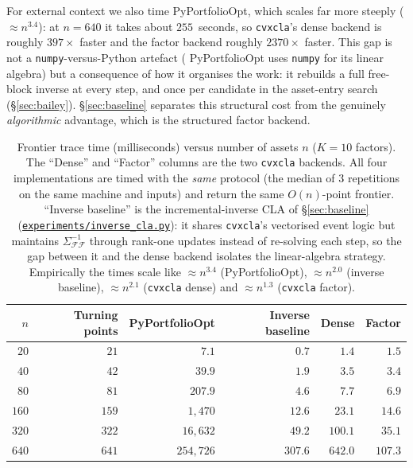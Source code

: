 \documentclass[11pt]{article}
\newcommand{\Sig}{\Sigma}
\newcommand{\F}{\mathcal{F}}        %
\newcommand{\inv}{^{-1}}
\newcommand{\repourl}{https://github.com/cvxgrp/cvxcla}
\newcommand{\srcref}{v1.8.1}
\newcommand{\srcfile}[2]{\href{\repourl/blob/\srcref/#1}{\texttt{#2}}}
\begin{document}
For external context we also time PyPortfolioOpt, which scales far more steeply
($\approx n^{3.4}$): at $n=640$ it takes about $255$~seconds, so \texttt{cvxcla}'s
dense backend is roughly $397\times$ faster and the factor backend roughly
$2370\times$ faster. This gap is not a \texttt{numpy}-versus-Python artefact (
PyPortfolioOpt uses \texttt{numpy} for its linear algebra) but a consequence of
how it organises the work: it rebuilds a full free-block inverse at every step,
and once per candidate in the asset-entry search (\S\ref{sec:bailey}).
\S\ref{sec:baseline} separates this structural cost from the genuinely
\emph{algorithmic} advantage, which is the structured factor backend.

\begin{table}[h]
\centering
\begin{tabular}{rrrrrr}
\toprule
$n$ & Turning points & PyPortfolioOpt & Inverse baseline & Dense & Factor \\
\midrule
$20$  & $21$  & $7.1$        & $0.7$   & $1.4$   & $1.5$ \\
$40$  & $42$  & $39.9$       & $1.9$   & $3.5$   & $3.4$ \\
$80$  & $81$  & $207.9$      & $4.6$   & $7.7$   & $6.9$ \\
$160$ & $159$ & $1{,}470$    & $12.6$  & $23.1$  & $14.6$ \\
$320$ & $322$ & $16{,}632$   & $49.2$  & $100.1$ & $35.1$ \\
$640$ & $641$ & $254{,}726$  & $307.6$ & $642.0$ & $107.3$ \\
\bottomrule
\end{tabular}
\caption{Frontier trace time (milliseconds) versus number of assets $n$ ($K=10$
factors). The ``Dense'' and ``Factor'' columns are the two \texttt{cvxcla}
backends. All four implementations are timed with the \emph{same} protocol (the
median of $3$ repetitions on the same machine and inputs) and return the same
$O(n)$-point frontier. ``Inverse baseline'' is the incremental-inverse CLA of
\S\ref{sec:baseline} (\srcfile{experiments/inverse_cla.py}{experiments/inverse\_cla.py}): it shares
\texttt{cvxcla}'s vectorised event logic but maintains $\Sig_{\F\F}\inv$ through
rank-one updates instead of re-solving each step, so the gap between it and the
dense backend isolates the linear-algebra strategy. Empirically the times scale
like $\approx n^{3.4}$ (PyPortfolioOpt), $\approx n^{2.0}$ (inverse baseline),
$\approx n^{2.1}$ (\texttt{cvxcla} dense) and $\approx n^{1.3}$
(\texttt{cvxcla} factor).}
\label{tab:scaling}
\end{table}
\end{document}
